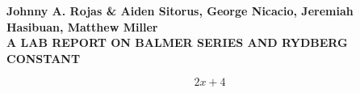 \documentclass[12pt]{article}
\begin{document}
\begin{center}
    {\textbf{Johnny A. Rojas \& Aiden Sitorus, George Nicacio, Jeremiah
        Hasibuan, Matthew Miller}}\\
    {\Large \textbf{A LAB REPORT ON BALMER SERIES AND RYDBERG CONSTANT}}
  \end{center}


\begin{equation*}
2x+4
\end{equation*}
\end{document}
